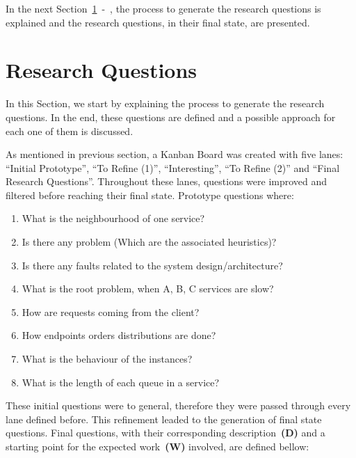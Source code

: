 In the next Section~\ref{sec:research_questions}~-~, the process to generate the research questions is explained and the research questions, in their final state, are presented.

\section{Research Questions}
\label{sec:research_questions}

In this Section, we start by explaining the process to generate the research questions. In the end, these questions are defined and a possible approach for each one of them is discussed.

As mentioned in previous section, a Kanban Board was created with five lanes: ``Initial Prototype'', ``To Refine (1)'', ``Interesting'', ``To Refine (2)'' and ``Final Research Questions''. Throughout these lanes, questions were improved and filtered before reaching their final state. Prototype questions where:

\begin{enumerate}
    \item What is the neighbourhood of one service?
    \item Is there any problem (Which are the associated heuristics)?
    \item Is there any faults related to the system design/architecture?
    \item What is the root problem, when A, B, C services are slow?
    \item How are requests coming from the client?
    \item How endpoints orders distributions are done?
    \item What is the behaviour of the instances?
    \item What is the length of each queue in a service?
\end{enumerate}

These initial questions were to general, therefore they were passed through every lane defined before. This refinement leaded to the generation of final state questions. Final questions, with their corresponding description~\textbf{(D)} and a starting point for the expected work~\textbf{(W)} involved, are defined bellow:

